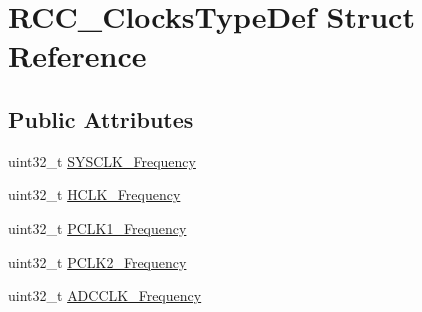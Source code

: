\hypertarget{structRCC__ClocksTypeDef}{
\section{RCC\_\-ClocksTypeDef Struct Reference}
\label{structRCC__ClocksTypeDef}
}
\subsection*{Public Attributes}
\begin{DoxyCompactItemize}
\item 
uint32\_\-t \hyperlink{structRCC__ClocksTypeDef_a2ba325067f3d464ad7955358932563d8}{SYSCLK\_\-Frequency}
\item 
uint32\_\-t \hyperlink{structRCC__ClocksTypeDef_a41b9859d33954117daf7fab42f804b92}{HCLK\_\-Frequency}
\item 
uint32\_\-t \hyperlink{structRCC__ClocksTypeDef_add4cfc63c35178d187107edc764e0b8f}{PCLK1\_\-Frequency}
\item 
uint32\_\-t \hyperlink{structRCC__ClocksTypeDef_ad854f0b70a6c4cf6de6dbbdcbc99b856}{PCLK2\_\-Frequency}
\item 
uint32\_\-t \hyperlink{structRCC__ClocksTypeDef_aa3dad8af3bb364b6232cf5446d478e7d}{ADCCLK\_\-Frequency}
\end{DoxyCompactItemize}



